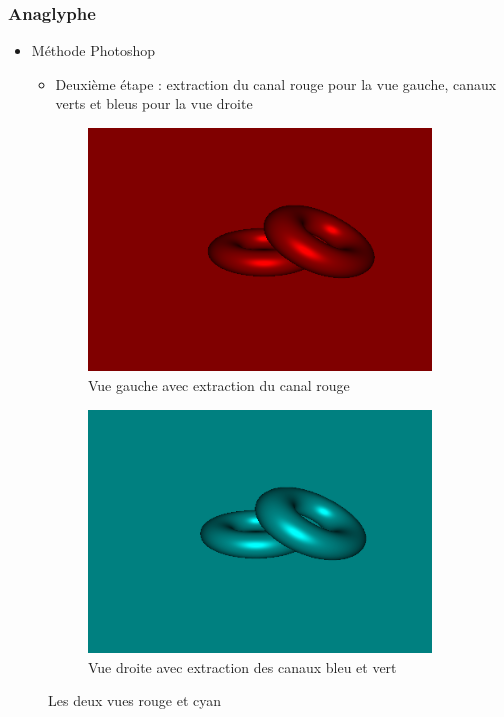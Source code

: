 \documentclass{beamer}
\begin{document}
\begin{frame}
\frametitle{Anaglyphe}
\begin{itemize}[label=$\bullet$]
\item Méthode Photoshop \cite{stereoAnaglyph}
	\begin{itemize}[label=$\circ$]
	\item Deuxième étape : extraction du canal rouge pour la vue gauche, canaux verts et bleus pour la vue droite 
	\end{itemize}
\end{itemize}
\begin{figure}
\centering
\begin{subfigure}{.5\textwidth}
  \centering
  \includegraphics[width=.8\linewidth]{gauche_rouge.png}
  \caption{Vue gauche avec extraction du canal rouge}
\end{subfigure}%
\begin{subfigure}{.5\textwidth}
  \centering
  \includegraphics[width=.8\linewidth]{droite_cyan.png}
  \caption{Vue droite avec extraction des canaux bleu et vert}
\end{subfigure}
\caption{Les deux vues rouge et cyan}
\end{figure}


	\end{frame}
\end{document}
